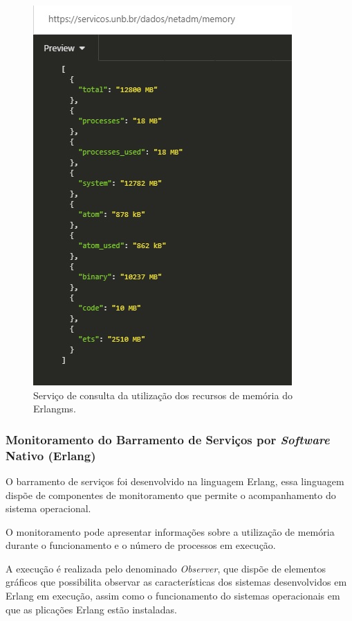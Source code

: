 \begin{figure}[H]
	\begin{center}
	\includegraphics[scale = 0.90]{img/monitoramentoEMS.jpg}
		\caption{Serviço de consulta da utilização dos recursos de memória do Erlangms.}
		\label{fun:fig:memoriaEMS}
	\end{center}
\end{figure}

\subsubsection{Monitoramento do Barramento de Serviços por \textit{Software} Nativo (Erlang)}
O barramento de serviços foi desenvolvido na linguagem Erlang, essa linguagem dispõe de componentes de monitoramento que permite o acompanhamento do sistema operacional. 

O monitoramento pode apresentar informações sobre a utilização de memória durante o funcionamento e o número de processos em execução. 

A execução é realizada pelo denominado \textit{Observer}, que dispõe de elementos gráficos que possibilita observar as características dos sistemas desenvolvidos em Erlang \cite{ericssonAB2002-2019} em execução, assim como o funcionamento do sistemas operacionais em que as plicações Erlang estão instaladas. 

